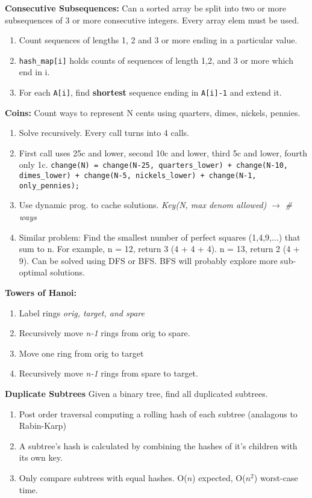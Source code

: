 \documentclass[12pt]{article}
\newcommand{\ON}{O($n$) }
\newcommand{\ONSQ}{O($n^2$) }
\begin{document}
\vspace{5mm}
\noindent
\textbf{Consecutive Subsequences:} Can a sorted array be split into two or more subsequences of
3 or more consecutive integers. Every array elem must be used.
\begin{enumerate}
\item Count sequences of lengths 1, 2 and 3 or more ending in a particular value.
\item \texttt{hash\_map[i]} holds counts of sequences of length 1,2, and 3 or more which end in i.
\item For each \texttt{A[i]}, find \textbf{shortest} sequence ending in \texttt{A[i]-1} and extend it.
\end{enumerate}


\vspace{5mm}
\noindent
\textbf{Coins:}
Count ways to represent N cents using quarters, dimes, nickels, pennies.
\begin{enumerate}
\item Solve recursively. Every call turns into 4 calls.
\item First call uses 25c and lower, second 10c and lower, third 5c and lower, fourth only 1c.\newline
\texttt{change(N) = change(N-25, quarters\_lower) + change(N-10, dimes\_lower) + change(N-5, nickels\_lower) + change(N-1, only\_pennies);}
\item Use dynamic prog. to cache solutions. \emph{Key(N, max denom allowed)} $\rightarrow$ \emph{\# ways}
\item Similar problem: Find the smallest number of perfect squares (1,4,9,...) that sum to n. For example, n = 12, return 3 (4 + 4 + 4). n = 13, return 2 (4 + 9). Can be solved using DFS or BFS. BFS will probably explore more sub-optimal solutions.
\end{enumerate}

\vspace{5mm}
\noindent
\textbf{Towers of Hanoi:}
\begin{enumerate}
\item Label rings \emph{orig, target, and spare}
\item Recursively move \emph{n-1} rings from orig to spare.
\item Move one ring from orig to target
\item Recursively move \emph{n-1} rings from spare to target.
\end{enumerate}

\vspace{5mm}
\noindent
\textbf{Duplicate Subtrees}
Given a binary tree, find all duplicated subtrees.
\begin{enumerate}
\item Post order traversal computing a rolling hash of each subtree (analagous to Rabin-Karp)
\item A subtree's hash is calculated by combining the hashes of it's children with its own key.
\item Only compare subtrees with equal hashes. \ON expected, \ONSQ worst-case time.
\end{enumerate}
\end{document}
